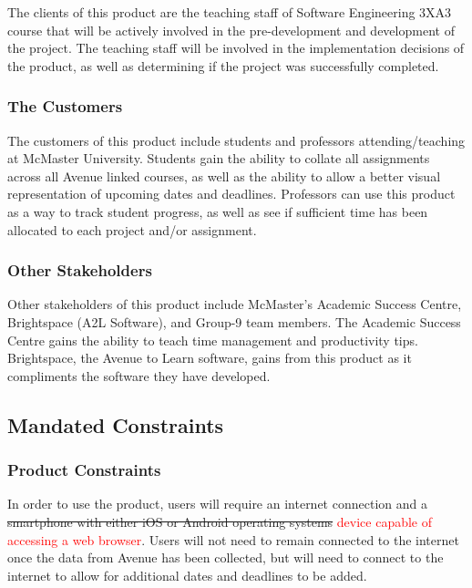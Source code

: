 \documentclass[12pt, titlepage]{article}
\begin{document}
The clients of this product are the teaching staff of Software Engineering 3XA3 course that will be actively involved in the pre-development and development of the project. The teaching staff will be involved in the implementation decisions of the product, as well as determining if the project was successfully completed.

\subsubsection{The Customers}

The customers of this product include students and professors attending/teaching at McMaster University. Students gain the ability to collate all assignments across all Avenue linked courses, as well as the ability to allow a better visual representation of upcoming dates and deadlines. Professors can use this product as a way to track student progress, as well as see if sufficient time has been allocated to each project and/or assignment.

\subsubsection{Other Stakeholders}

Other stakeholders of this product include McMaster’s Academic Success Centre, Brightspace (A2L Software), and Group-9 team members. The Academic Success Centre gains the ability to teach time management and productivity tips. Brightspace, the Avenue to Learn software, gains from this product as it compliments the software they have developed.

\subsection{Mandated Constraints}

\subsubsection{Product Constraints}

In order to use the product, users will require an internet connection and a \sout{smartphone with either iOS or Android operating systems} \textcolor{red}{device capable of accessing a web browser}. Users will not need to remain connected to the internet once the data from Avenue has been collected, but will need to connect to the internet to allow for additional dates and deadlines to be added.
\end{document}
